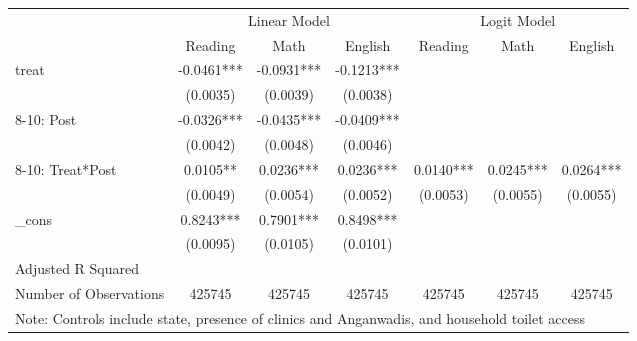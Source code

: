 {
\def\sym#1{\ifmmode^{#1}\else\(^{#1}\)\fi}
\begin{tabular}{l*{6}{c}}
\hline\hline
          &\multicolumn{3}{c}{Linear Model}&\multicolumn{3}{c}{Logit Model}\\\cmidrule(lr){2-4}\cmidrule(lr){5-7}
          &\multicolumn{1}{c}{Reading}&\multicolumn{1}{c}{Math}&\multicolumn{1}{c}{English}&\multicolumn{1}{c}{Reading}&\multicolumn{1}{c}{Math}&\multicolumn{1}{c}{English}\\
\hline
treat     &-0.0461***&-0.0931***&-0.1213***&    &    &    \\
          &(0.0035)   &(0.0039)   &(0.0038)   &    &    &    \\
[1em]
8-10: Post&-0.0326***&-0.0435***&-0.0409***&    &    &    \\
          &(0.0042)   &(0.0048)   &(0.0046)   &    &    &    \\
[1em]
8-10: Treat*Post&0.0105** &0.0236***&0.0236***&0.0140***&0.0245***&0.0264***\\
          &(0.0049)   &(0.0054)   &(0.0052)   &(0.0053)   &(0.0055)   &(0.0055)   \\
[1em]
\_cons    &0.8243***&0.7901***&0.8498***&    &    &    \\
          &(0.0095)   &(0.0105)   &(0.0101)   &    &    &    \\
\hline
Adjusted R Squared&    &    &    &    &    &    \\
Number of Observations&425745   &425745   &425745   &425745   &425745   &425745   \\
\hline\hline
\multicolumn{7}{l}{\footnotesize Note: Controls include state, presence of clinics and Anganwadis, and household toilet access}\\
\end{tabular}
}
